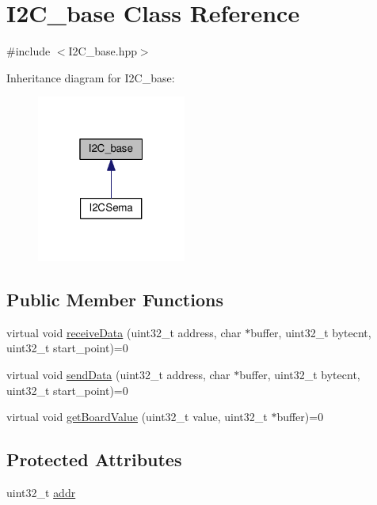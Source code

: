 \hypertarget{class_i2_c__base}{}\section{I2\+C\+\_\+base Class Reference}
\label{class_i2_c__base}


{\ttfamily \#include $<$I2\+C\+\_\+base.\+hpp$>$}



Inheritance diagram for I2\+C\+\_\+base\+:\nopagebreak
\begin{figure}[H]
\begin{center}
\leavevmode
\includegraphics[width=139pt]{class_i2_c__base__inherit__graph}
\end{center}
\end{figure}
\subsection*{Public Member Functions}
\begin{DoxyCompactItemize}
\item 
virtual void \hyperlink{class_i2_c__base_a6938c7e851ac11836d2c69253ecd853a}{receive\+Data} (uint32\+\_\+t address, char $\ast$buffer, uint32\+\_\+t bytecnt, uint32\+\_\+t start\+\_\+point)=0
\item 
virtual void \hyperlink{class_i2_c__base_af78604423196f5b54602b08425c25622}{send\+Data} (uint32\+\_\+t address, char $\ast$buffer, uint32\+\_\+t bytecnt, uint32\+\_\+t start\+\_\+point)=0
\item 
virtual void \hyperlink{class_i2_c__base_a91e938610d77e20ae14e98861eb555c2}{get\+Board\+Value} (uint32\+\_\+t value, uint32\+\_\+t $\ast$buffer)=0
\end{DoxyCompactItemize}
\subsection*{Protected Attributes}
\begin{DoxyCompactItemize}
\item 
uint32\+\_\+t \hyperlink{class_i2_c__base_a49e4339d64cc99fcec489dea55c09e48}{addr}
\end{DoxyCompactItemize}


